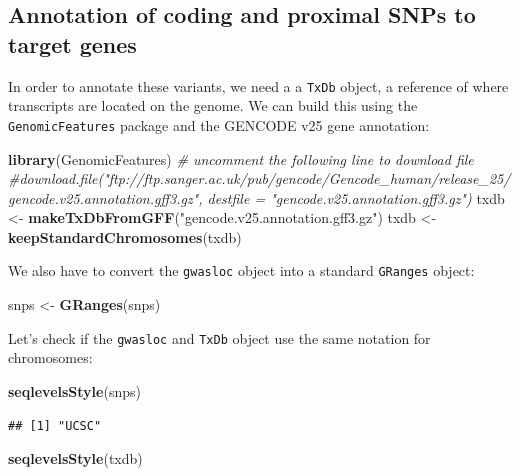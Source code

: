 \documentclass[9pt,a4paper,]{extarticle}
\newenvironment{Shaded}{\begin{snugshade}}{\end{snugshade}}
\newcommand{\KeywordTok}[1]{\textcolor[rgb]{0.13,0.29,0.53}{\textbf{#1}}}
\newcommand{\StringTok}[1]{\textcolor[rgb]{0.31,0.60,0.02}{#1}}
\newcommand{\CommentTok}[1]{\textcolor[rgb]{0.56,0.35,0.01}{\textit{#1}}}
\newcommand{\NormalTok}[1]{#1}
\theoremstyle{definition}
\theoremstyle{definition}
\theoremstyle{definition}
\theoremstyle{remark}
\begin{document}
\subsection{Annotation of coding and proximal SNPs to target genes}\label{annotation-of-coding-and-proximal-snps-to-target-genes}

In order to annotate these variants, we need a a \texttt{TxDb} object, a reference of where transcripts are located on the genome.
We can build this using the \texttt{GenomicFeatures} \citep{Lawrence2013} package and the GENCODE v25 gene annotation:

\begin{Shaded}
\begin{Highlighting}[]
\KeywordTok{library}\NormalTok{(GenomicFeatures)}
\CommentTok{# uncomment the following line to download file}
\CommentTok{#download.file("ftp://ftp.sanger.ac.uk/pub/gencode/Gencode_human/release_25/gencode.v25.annotation.gff3.gz", destfile = "gencode.v25.annotation.gff3.gz")}
\NormalTok{txdb <-}\StringTok{ }\KeywordTok{makeTxDbFromGFF}\NormalTok{(}\StringTok{"gencode.v25.annotation.gff3.gz"}\NormalTok{)}
\NormalTok{txdb <-}\StringTok{ }\KeywordTok{keepStandardChromosomes}\NormalTok{(txdb)}
\end{Highlighting}
\end{Shaded}

We also have to convert the \texttt{gwasloc} object into a standard \texttt{GRanges} object:

\begin{Shaded}
\begin{Highlighting}[]
\NormalTok{snps <-}\StringTok{ }\KeywordTok{GRanges}\NormalTok{(snps)}
\end{Highlighting}
\end{Shaded}

Let's check if the \texttt{gwasloc} and \texttt{TxDb} object use the same notation for chromosomes:

\begin{Shaded}
\begin{Highlighting}[]
\KeywordTok{seqlevelsStyle}\NormalTok{(snps)}
\end{Highlighting}
\end{Shaded}

\begin{verbatim}
## [1] "UCSC"
\end{verbatim}

\begin{Shaded}
\begin{Highlighting}[]
\KeywordTok{seqlevelsStyle}\NormalTok{(txdb)}
\end{Highlighting}
\end{Shaded}
\end{document}
